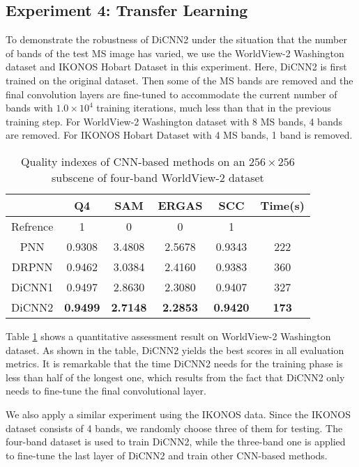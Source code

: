 \documentclass[journal]{IEEEtran}
\begin{document}
\subsection{Experiment 4: Transfer Learning}

To demonstrate the robustness of DiCNN2 under the situation that the number of bands of the test MS image has varied, we use the WorldView-2 Washington dataset and IKONOS Hobart Dataset in this experiment. Here, DiCNN2 is first trained on the original dataset. Then some of the MS bands are removed and the final convolution layers are fine-tuned to accommodate the current number of bands with $1.0 \times 10^4$ training iterations, much less than that in the previous training step. For WorldView-2 Washington dataset with 8 MS bands, 4 bands are removed. For IKONOS Hobart Dataset with 4 MS bands, 1 band is removed.

\begin{table}[htp]
\small
\caption{Quality indexes of CNN-based methods on an $256\times256$ subscene of four-band WorldView-2 dataset}
\centering
\begin{tabular}{c|ccccc}
\hline
{}&Q4&SAM& ERGAS &SCC&Time(s)\\
\hline
Refrence&1 &0 &0 &1&{}\\
\hline
\hline
PNN &0.9308 &3.4808 &2.5678 &0.9343&222\\
\hline
DRPNN &0.9462 &3.0384 &2.4160 &0.9383&360\\
\hline
DiCNN1 &0.9497 &2.8630 &2.3080 &0.9407 &327\\
\hline
DiCNN2 &\textbf{0.9499} &\textbf{2.7148} &\textbf{2.2853}  &\textbf{0.9420} &\textbf{173}\\
\hline
\end{tabular}
\label{table:transwv}
\end{table}

Table \ref{table:transwv} shows a quantitative assessment result on WorldView-2 Washington dataset. As shown in the table, DiCNN2 yields the best scores in all evaluation metrics. It is remarkable that the time DiCNN2 needs for the training phase is less than half of the longest one, which results from the fact that DiCNN2 only needs to fine-tune the final convolutional layer.

We also apply a similar experiment using the IKONOS data. Since the IKONOS dataset consists of 4 bands, we randomly choose three of them for testing. The four-band dataset is used to train DiCNN2, while the three-band one is applied to fine-tune the last layer of DiCNN2 and train other CNN-based methods.
\end{document}
